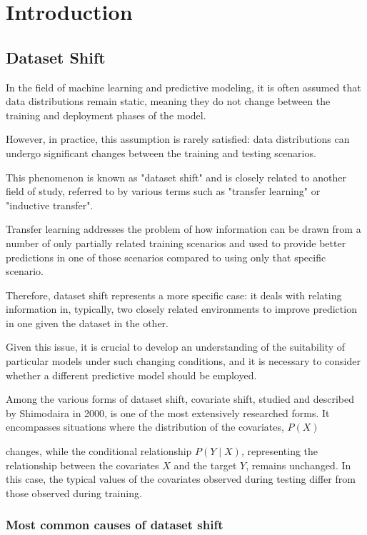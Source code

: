\chapter{Introduction}


\section{Dataset Shift}

In the field of machine learning and predictive modeling, it is often assumed that data distributions remain static, meaning they do not change between the training and deployment phases of the model.

However, in practice, this assumption is rarely satisfied: data distributions can undergo significant changes between the training and testing scenarios.

This phenomenon is known as "dataset shift" and is closely related to another field of study, referred to by various terms such as "transfer learning" or "inductive transfer".

Transfer learning addresses the problem of how information can be drawn from a number of only partially related training scenarios and used to provide better predictions in one of those scenarios compared to using only that specific scenario.

Therefore, dataset shift represents a more specific case: it deals with relating information in, typically, two closely related environments to improve prediction in one given the dataset in the other.

Given this issue, it is crucial to develop an understanding of the suitability of particular models under such changing conditions, and it is necessary to consider whether a different predictive model should be employed.

Among the various forms of dataset shift, covariate shift, studied and described by Shimodaira in 2000, is one of the most extensively researched forms. It encompasses situations where the distribution of the covariates, $P(X)$

changes, while the conditional relationship $P(Y \mid X)$, representing the relationship between the covariates $X$ and the target $Y$, remains unchanged. In this case, the typical values of the covariates observed during testing differ from those observed during training.



\subsection{Most common causes of dataset shift}
	
